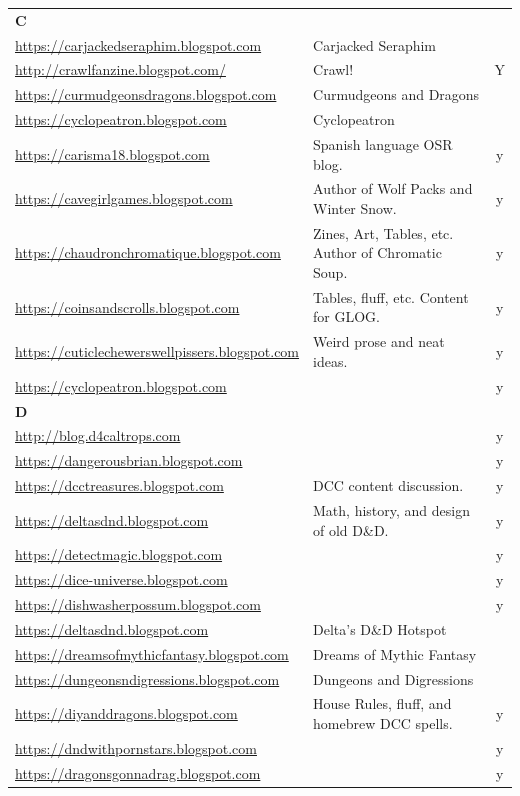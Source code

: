 \documentclass[a4paper, 11pt, twoside]{article}
\begin{document}
\begin{longtable}{p{6cm}p{8cm}c}
\textbf{C} &  & \\
\url{https://carjackedseraphim.blogspot.com} & Carjacked Seraphim & \\
\url{http://crawlfanzine.blogspot.com/} & Crawl! & Y\\
\url{https://curmudgeonsdragons.blogspot.com} & Curmudgeons and Dragons & \\
\url{https://cyclopeatron.blogspot.com} & Cyclopeatron & \\
\url{https://carisma18.blogspot.com} & Spanish language OSR blog. & y\\
\url{https://cavegirlgames.blogspot.com} & Author of Wolf Packs and Winter Snow. & y\\
\url{https://chaudronchromatique.blogspot.com} & Zines, Art, Tables, etc. Author of Chromatic Soup. & y\\
\url{https://coinsandscrolls.blogspot.com} & Tables, fluff, etc. Content for GLOG. & y\\
\url{https://cuticlechewerswellpissers.blogspot.com} & Weird prose and neat ideas. & y\\
\url{https://cyclopeatron.blogspot.com} &  & y\\
\textbf{D} &  & \\
\url{http://blog.d4caltrops.com} &  & y\\
\url{https://dangerousbrian.blogspot.com} &  & y\\
\url{https://dcctreasures.blogspot.com} & DCC content discussion. & y\\
\url{https://deltasdnd.blogspot.com} & Math, history, and design of old D\&D. & y\\
\url{https://detectmagic.blogspot.com} &  & y\\
\url{https://dice-universe.blogspot.com} &  & y\\
\url{https://dishwasherpossum.blogspot.com} &  & y\\
\url{https://deltasdnd.blogspot.com} & Delta's D\&D Hotspot & \\
\url{https://dreamsofmythicfantasy.blogspot.com} & Dreams of Mythic Fantasy & \\
\url{https://dungeonsndigressions.blogspot.com} & Dungeons and Digressions & \\
\url{https://diyanddragons.blogspot.com} & House Rules, fluff, and homebrew DCC spells. & y\\
\url{https://dndwithpornstars.blogspot.com} &  & y\\
\url{https://dragonsgonnadrag.blogspot.com} &  & y\\

\end{longtable}
\end{document}
